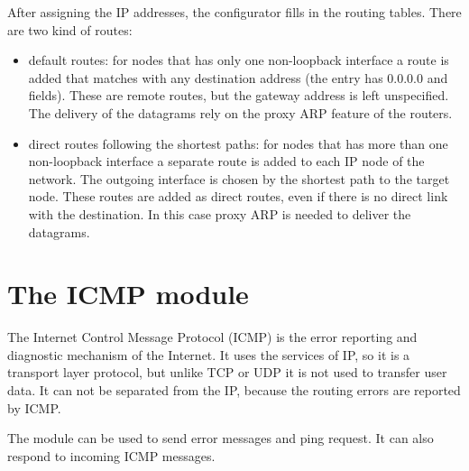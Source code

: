 After assigning the IP addresses, the configurator fills in the routing tables.
There are two kind of routes:
\begin{itemize}
  \item default routes: for nodes that has only one non-loopback interface
        a route is added that matches with any destination address
        (the entry has 0.0.0.0  and  fields).
        These are remote routes, but the gateway address is left unspecified.
        The delivery of the datagrams rely on the proxy ARP feature of the
        routers. 
  \item direct routes following the shortest paths: for nodes that has more
        than one non-loopback interface a separate route is added to each
        IP node of the network. The outgoing interface is chosen by the
        shortest path to the target node. These routes are
        added as direct routes, even if there is no direct link with the
        destination. In this case proxy ARP is needed to deliver the datagrams.
\end{itemize}



\section{The ICMP module}

The Internet Control Message Protocol (ICMP) is the error reporting and
diagnostic mechanism of the Internet.
It uses the services of IP, so it is a transport layer protocol, but unlike
TCP or UDP it is not used to transfer user data. It can not be separated
from the IP, because the routing errors are reported by ICMP.

The  module can be used to send error messages and ping
request. It can also respond to incoming ICMP messages.


